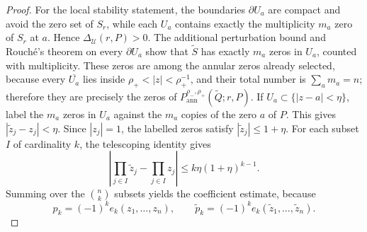 \begin{proof}
For the local stability statement, the boundaries \(\partial U_a\) are compact and avoid the zero set of \(S_r\), while each \(U_a\) contains exactly the multiplicity \(m_a\) zero of \(S_r\) at \(a\).  Hence \(\Delta_{\mathcal U}(r,P)>0\).  The additional perturbation bound and Rouch\'e's theorem on every \(\partial U_a\) show that \(\widetilde S\) has exactly \(m_a\) zeros in \(U_a\), counted with multiplicity.  These zeros are among the annular zeros already selected, because every \(\overline{U_a}\) lies inside \(\rho_+<|z|<\rho_+^{-1}\), and their total number is \(\sum_a m_a=n\); therefore they are precisely the zeros of \(P_{\mathrm{ann}}^{\rho_-,\rho_+}(\widetilde Q;r,P)\).  If \(U_a\subset\{|z-a|<\eta\}\), label the \(m_a\) zeros in \(U_a\) against the \(m_a\) copies of the zero \(a\) of \(P\).  This gives \(|\widetilde z_j-z_j|<\eta\).  Since \(|z_j|=1\), the labelled zeros satisfy \(|\widetilde z_j|\le1+\eta\).  For each subset \(I\) of cardinality \(k\), the telescoping identity gives
\[
\left|\prod_{j\in I}\widetilde z_j-
\prod_{j\in I}z_j\right|
\le k\eta(1+\eta)^{k-1}.
\]
Summing over the \(\binom nk\) subsets yields the coefficient estimate, because
\[
p_k=(-1)^ke_k(z_1,
\dots,z_n),\qquad
\widetilde p_k=(-1)^ke_k(\widetilde z_1,
\dots,
\widetilde z_n).
\]
\end{proof}

